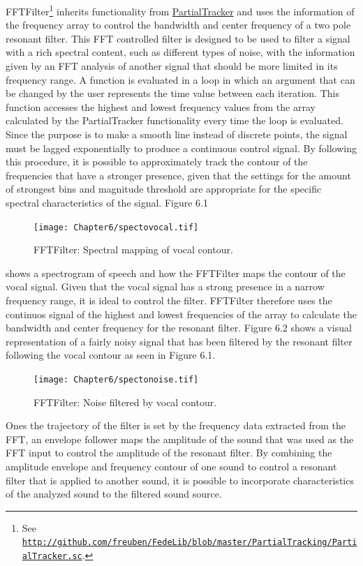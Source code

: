 FFTFilter\footnote{See \href{http://github.com/freuben/FedeLib/blob/master/PartialTracking/PartialTracker.sc}{\texttt{http://github.com/freuben/FedeLib/blob/master/PartialTracking/PartialTracker.sc}}.} inherits functionality from \hyperlink{partrack}{PartialTracker} and uses the information of the frequency array to control the bandwidth and center frequency of a two pole resonant filter. This FFT controlled filter is designed to be used to filter a signal with a rich spectral content, such as different types of noise, with the information given by an FFT analysis of another signal that should be more limited in its frequency range. A function is evaluated in a loop in which an argument that can be changed by the user represents the time value between each iteration. This function accesses the highest and lowest frequency values from the array calculated by the PartialTracker functionality every time the loop is evaluated. Since the purpose is to make a smooth line instead of discrete points, the signal must be lagged exponentially to produce a continuous control signal. By following this procedure, it is possible to approximately track the contour of the frequencies that have a stronger presence, given that the settings for the amount of strongest bins and magnitude threshold are appropriate for the specific spectral characteristics of the signal. Figure 6.1 
\begin{figure}[htbp] %
   \centering
   \texttt{[image: Chapter6/spectovocal.tif]} %
   \caption{FFTFilter: Spectral mapping of vocal contour.}
   \label{fig:example}
\end{figure}
shows a spectrogram of speech and how the FFTFilter maps the contour of the vocal signal. Given that the vocal signal has a strong presence in a narrow frequency range, it is ideal to control the filter. FFTFilter therefore uses the continuos signal of the highest and lowest frequencies of the array to calculate the bandwidth and center frequency for the resonant filter. Figure 6.2 shows a visual representation of a fairly noisy signal that has been filtered by the resonant filter following the vocal contour as seen in Figure 6.1. 
\begin{figure}[htbp] %
   \centering
   \texttt{[image: Chapter6/spectonoise.tif]} %
   \caption{FFTFilter: Noise filtered by vocal contour.}
   \label{fig:example}
\end{figure}
Ones the trajectory of the filter is set by the frequency data extracted from the FFT, an envelope follower maps the amplitude of the sound that was used as the FFT input to control the amplitude of the resonant filter. By combining the amplitude envelope and frequency contour of one sound to control a resonant filter that is applied to another sound, it is possible to incorporate characteristics of the analyzed sound to the filtered sound source.

